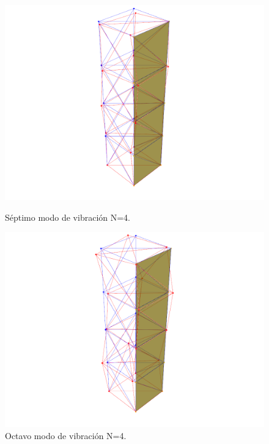 \begin{figure}[H]
    \begin{minipage}[b]{0.5\textwidth}
        \centering
        \includegraphics[width=\textwidth]{FOTOS/mod7_4.png}
        \caption{Séptimo modo de vibración N=4.}
    \end{minipage}
    \hfill
    \begin{minipage}[b]{0.5\textwidth}
        \centering
        \includegraphics[width=\textwidth]{FOTOS/mod8_4.png}
        \caption{Octavo modo de vibración N=4.}
    \end{minipage}
\end{figure}

